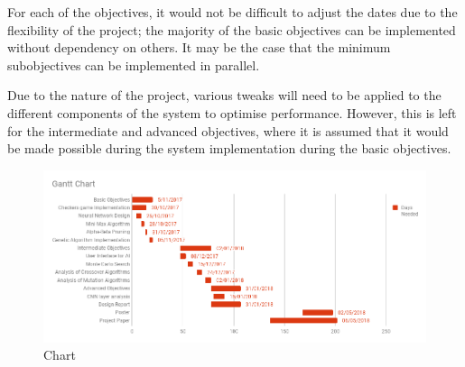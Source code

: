For each of the objectives, it would not be difficult to adjust the
dates due to the flexibility of the project; the majority of the basic
objectives can be implemented without dependency on others. It may be
the case that the minimum subobjectives can be implemented in parallel.

Due to the nature of the project, various tweaks will need to be applied
to the different components of the system to optimise performance.
However, this is left for the intermediate and advanced objectives,
where it is assumed that it would be made possible during the system
implementation during the basic objectives.

\begin{figure}
\centering
\includegraphics{chart.png}
\caption{Chart}
\end{figure}
